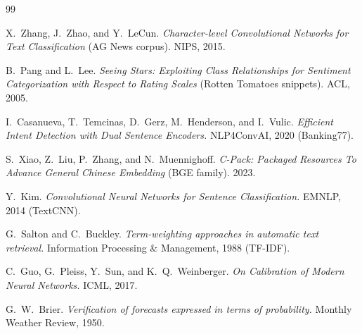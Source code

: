 \begin{thebibliography}{99}

X.~Zhang, J.~Zhao, and Y.~LeCun.
\textit{Character-level Convolutional Networks for Text Classification}
(AG News corpus). NIPS, 2015.

B.~Pang and L.~Lee.
\textit{Seeing Stars: Exploiting Class Relationships for Sentiment Categorization with Respect to Rating Scales}
(Rotten Tomatoes snippets). ACL, 2005.

I.~Casanueva, T.~Temcinas, D.~Gerz, M.~Henderson, and I.~Vulic.
\textit{Efficient Intent Detection with Dual Sentence Encoders.}
NLP4ConvAI, 2020 (Banking77).

S.~Xiao, Z.~Liu, P.~Zhang, and N.~Muennighoff.
\textit{C-Pack: Packaged Resources To Advance General Chinese Embedding}
(BGE family). 2023.

Y.~Kim.
\textit{Convolutional Neural Networks for Sentence Classification.}
EMNLP, 2014 (TextCNN).

G.~Salton and C.~Buckley.
\textit{Term-weighting approaches in automatic text retrieval.}
Information Processing \& Management, 1988 (TF-IDF).

C.~Guo, G.~Pleiss, Y.~Sun, and K.~Q.~Weinberger.
\textit{On Calibration of Modern Neural Networks.}
ICML, 2017.

G.~W.~Brier.
\textit{Verification of forecasts expressed in terms of probability.}
Monthly Weather Review, 1950.

\end{thebibliography}
